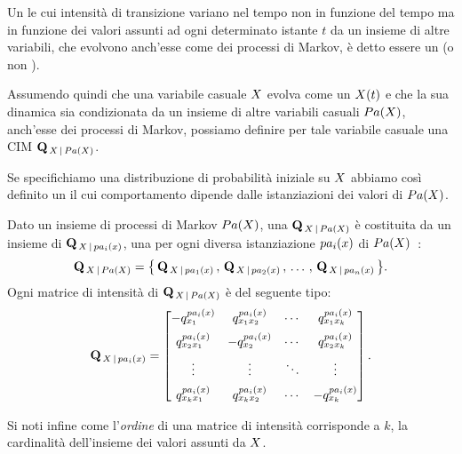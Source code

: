 \begin{definizione}[\upcase\mprocess*{} \cond*{}]
\label{defn:conditional-markov-process}
Un \mprocess*{} le cui intensità di transizione variano nel tempo non in funzione del tempo ma in funzione dei valori assunti ad ogni determinato istante $t$ da un insieme di altre variabili, che evolvono anch'esse come dei processi di Markov, è detto essere un \mprocess*{} \cond*{} (o \mprocess*{} non \omog*{}).

Assumendo quindi che una variabile casuale $\mathnormal{X}$ evolva come un \mprocess*{} $\mathnormal{X}(t)$ e che la sua dinamica sia condizionata da un insieme di altre variabili casuali $Pa(\mathnormal{X})$, anch'esse dei processi di Markov, possiamo definire per tale variabile casuale una \acf{CIM} $\mathbf{Q}_{\,\mathnormal{X}\,\arrowvert\,Pa(\mathnormal{X})}$.

Se specifichiamo una distribuzione di probabilità iniziale su $\mathnormal{X}$ abbiamo così definito un \mprocess*{} il cui comportamento dipende dalle istanziazioni dei valori di $Pa(\mathnormal{X})$.
\end{definizione}

\begin{definizione}
\label{defn:cim}
Dato un insieme di processi di Markov $Pa(\mathnormal{X})$, una \im*{} \cond*{} $\mathbf{Q}_{\,\mathnormal{X}\,\arrowvert\,Pa(\mathnormal{X})}$ è costituita da un insieme di \im{} $\mathbf{Q}_{\,\mathnormal{X}\,\arrowvert\,pa_i(\mathnormal{x})}$, una per ogni diversa istanziazione $pa_i(\mathnormal{x})$ di $Pa(\mathnormal{X})$~\citep{Stella2012}:
\[
\mathbf{Q}_{\,\mathnormal{X}\,\arrowvert\,Pa(\mathnormal{X})}=\big\{\,\mathbf{Q}_{\,\mathnormal{X}\,\arrowvert\,pa_1(x)}\,,\,\mathbf{Q}_{\,\mathnormal{X}\,\arrowvert\,pa_2(x)}\,,\,\dotsc\,,\,\mathbf{Q}_{\,\mathnormal{X}\,\arrowvert\,pa_n(x)}\,\big\}\text{.}
\]
Ogni matrice di intensità di $\mathbf{Q}_{\,\mathnormal{X}\,\arrowvert\,Pa(\mathnormal{X})}$ è del seguente tipo:\\
\[
\mathbf{Q}_{\,\mathnormal{X}\,\arrowvert\,pa_i(\mathnormal{x})}=
\begin{bmatrix}
-q_{x_1}^{pa_i(\mathnormal{x})}   & q_{x_1x_2}^{pa_i(\mathnormal{x})} & \cdots & q_{x_1x_k}^{pa_i(\mathnormal{x})}\\[0.5em]
q_{x_2x_1}^{pa_i(\mathnormal{x})} & -q_{x_2}^{pa_i(\mathnormal{x})}   & \cdots & q_{x_2x_k}^{pa_i(\mathnormal{x})}\\[0.5em]
\vdots           & \vdots           & \ddots & \vdots\\[0.5em]
q_{x_kx_1}^{pa_i(\mathnormal{x})} & q_{x_kx_2}^{pa_i(\mathnormal{x})} & \cdots & -q_{x_k}^{pa_i(\mathnormal{x})}
\end{bmatrix}
\text{.}
\]
\end{definizione}
Si noti infine come l'\emph{ordine} di una matrice di intensità corrisponde a $k$, la cardinalità dell'insieme dei valori assunti da $\mathnormal{X}$.

